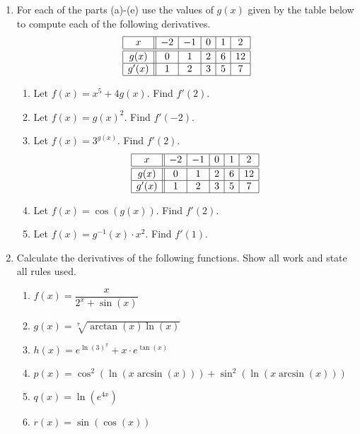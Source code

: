 \documentclass[11pt]{article}
\begin{document}
\begin{enumerate}
\vfill
\newpage

\item For each of the parts (a)-(e) use the values of $g(x)$ given by
  the table below to compute each of the following derivatives.
  \[
  \begin{array}{|c||c|c|c|c|c|}
    \hline
    x&-2&-1&0&1&2\\
    \hline
    \hline
    g(x)&0&1&2&6&12\\
    \hline
    g'(x)&1&2&3&5&7\\
    \hline
  \end{array}
  \]

  \begin{enumerate}
  \item Let $f(x)=x^5+4g(x)$. Find $f'(2)$.
    \vfill
  \item Let $f(x)=g(x)^2$. Find $f'(-2)$.
    \vfill
  \item Let $f(x)=3^{g(x)}$. Find $f'(2)$.
    \vfill
    \newpage
    \[
    \begin{array}{|c||c|c|c|c|c|}
      \hline
      x&-2&-1&0&1&2\\
      \hline
      \hline
      g(x)&0&1&2&6&12\\
      \hline
      g'(x)&1&2&3&5&7\\
      \hline
    \end{array}
    \]
  \item Let $f(x)=\cos(g(x))$. Find $f'(2)$.
    \vfill
  \item Let $f(x)=g^{-1}(x)\cdot x^2$.  Find $f'(1)$.
    \vfill

  \end{enumerate}

\newpage

\item Calculate the derivatives of the following functions.  Show all
  work and state all rules used.
  \begin{enumerate}
  \item $f(x)=\dfrac{x}{2^x+\sin(x)}$
    \vfill
  \item $g(x)=\sqrt[7]{\arctan(x)\ln(x)}$
    \vfill
    \newpage
  \item $h(x)=e^{\ln(3)^{\pi}} + x\cdot e^{\tan(x)}$
    \vfill
  \item $p(x)=\cos^2\left(\ln(x\arcsin(x))\right)+\sin^2(\ln(x\arcsin(x)))$
    \vfill
    \newpage
  \item $q(x)=\ln\left(e^{4x}\right)$
    \vfill
  \item $r(x)=\sin(\cos(x))$
    \vfill
  \end{enumerate}


\end{enumerate}
\end{document}
